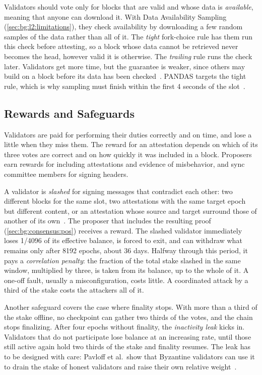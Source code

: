 Validators should vote only for blocks that are valid and whose data is \emph{available}, meaning that anyone can download it.
With Data Availability Sampling (\autoref{sec:bg:l2:limitations}), they check availability by downloading a few random samples of the data rather than all of it.
The \emph{tight} fork-choice rule has them run this check before attesting, so a block whose data cannot be retrieved never becomes the head, however valid it is otherwise.
The \emph{trailing} rule runs the check later.
Validators get more time, but the guarantee is weaker, since others may build on a block before its data has been checked~\cite{damato2024dasforkchoice}.
PANDAS targets the tight rule, which is why sampling must finish within the first 4 seconds of the slot~\cite{pigaglio2025pandas}.

\subsection{Rewards and Safeguards}\label{sec:bg:eth-pos:safeguards}

Validators are paid for performing their duties correctly and on time, and lose a little when they miss them.
The reward for an attestation depends on which of its three votes are correct and on how quickly it was included in a block.
Proposers earn rewards for including attestations and evidence of misbehavior, and sync committee members for signing headers.

A validator is \emph{slashed} for signing messages that contradict each other: two different blocks for the same slot, two attestations with the same target epoch but different content, or an attestation whose source and target surround those of another of its own~\cite{schwarzschilling2022three}.
The proposer that includes the resulting proof (\autoref{sec:bg:consensus:pos}) receives a reward.
The slashed validator immediately loses 1/4096 of its effective balance, is forced to exit, and can withdraw what remains only after 8192 epochs, about 36 days.
Halfway through this period, it pays a \emph{correlation penalty}: the fraction of the total stake slashed in the same window, multiplied by three, is taken from its balance, up to the whole of it.
A one-off fault, usually a misconfiguration, costs little.
A coordinated attack by a third of the stake costs the attackers all of it.

Another safeguard covers the case where finality stops.
With more than a third of the stake offline, no checkpoint can gather two thirds of the votes, and the chain stops finalizing.
After four epochs without finality, the \emph{inactivity leak} kicks in.
Validators that do not participate lose balance at an increasing rate, until those still active again hold two thirds of the stake and finality resumes.
The leak has to be designed with care: Pavloff et al.\ show that Byzantine validators can use it to drain the stake of honest validators and raise their own relative weight~\cite{pavloff2024byzantine}.


